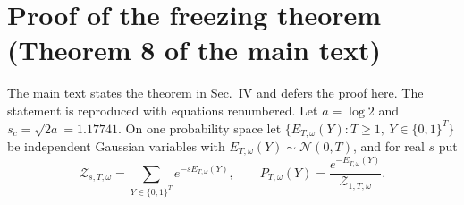 \documentclass[aps,prx,reprint,superscriptaddress,nobibnotes,longbibliography]{revtex4-2}
\begin{document}
\section{Proof of the freezing theorem (Theorem 8 of the main text)}
\label{sm:remproof}

The main text states the theorem in Sec.~IV and defers the proof here.
The statement is reproduced with equations renumbered.  Let $a=\log 2$
and $s_c=\sqrt{2a}=1.17741$.  On one probability space let
$\{E_{T,\omega}(Y):T\ge1,\ Y\in\{0,1\}^T\}$ be independent Gaussian
variables with $E_{T,\omega}(Y)\sim\mathcal N(0,T)$, and for real $s$
put
\begin{equation}
 \mathcal Z_{s,T,\omega}=\sum_{Y\in\{0,1\}^T}e^{-sE_{T,\omega}(Y)},\qquad
 P_{T,\omega}(Y)=\frac{e^{-E_{T,\omega}(Y)}}{\mathcal Z_{1,T,\omega}}.
 \label{eqS:remP}
\end{equation}
\end{document}
